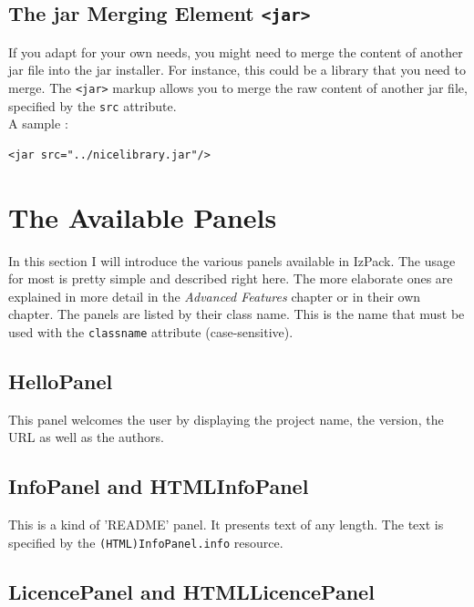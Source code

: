 \subsection{The jar Merging Element \texttt{<jar>}}

If you adapt \IzPack for your own needs, you might need to merge the
content of another jar file into the jar installer. For instance, this
could be a library that you need to merge. The \texttt{<jar>} markup
allows you to merge the raw content of another jar file, specified by
the \texttt{src} attribute.\\

A sample :
\footnotesize
\begin{verbatim}
<jar src="../nicelibrary.jar"/>
\end{verbatim}
\normalsize

\section{The Available Panels}

In this section I will introduce the various panels available in IzPack.
The usage for most is pretty simple and described right here. The more
elaborate ones are explained in more detail in the \textit{Advanced
Features} chapter or in their own chapter. The panels are listed by
their class name. This is the name that must be used with the
\texttt{classname} attribute (case-sensitive).\\

\subsection{HelloPanel}

This panel welcomes the user by displaying the project name, the
version, the URL as well as the authors.\\

\subsection{InfoPanel and HTMLInfoPanel}

This is a kind of 'README' panel. It presents text of any length. The
text is specified by the \texttt{(HTML)InfoPanel.info} resource.\\

\subsection{LicencePanel and HTMLLicencePanel}

